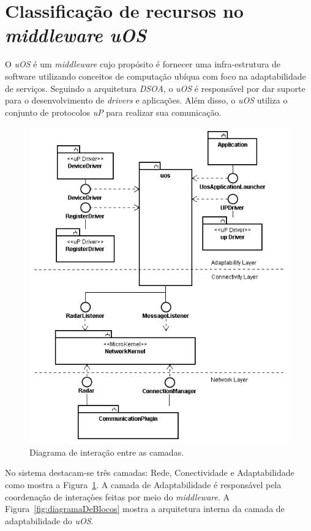 \section{Classificação de recursos no \emph{middleware uOS}}
\label{sec:classificacaoNoUos}

O \emph{uOS} é um \emph{middleware} cujo propósito é fornecer uma infra-estrutura de software utilizando conceitos de computação ubíqua com foco na adaptabilidade de serviços. Seguindo a arquitetura \emph{DSOA}, o \emph{uOS} é responsável por dar suporte para o desenvolvimento de \emph{drivers} e aplicações. Além disso, o \emph{uOS} utiliza o conjunto de protocolos \emph{uP} para realizar sua comunicação.

\begin{figure}[ht]
	\center
	\includegraphics[scale=0.4]{imagens/arquiteturaDoMiddlewareUOS}
	\caption{Diagrama de interação entre as camadas.}
	\label{fig:camadasUOS}
\end{figure}

No sistema destacam-se três camadas: Rede, Conectividade e Adaptabilidade como mostra a Figura~\ref{fig:camadasUOS}. A camada de Adaptabilidade é responsável pela coordenação de interaçòes feitas por meio do \emph{middleware}. A Figura~\ref{fig:diagramaDeBlocos} mostra a arquitetura interna da camada de adaptabilidade do \emph{uOS}.


